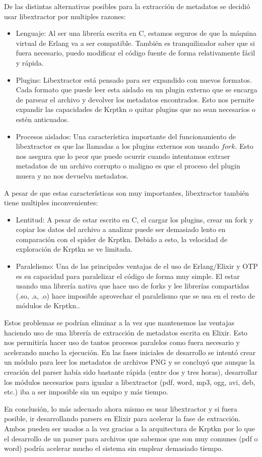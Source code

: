 De las distintas alternativas posibles para la extracción de metadatos se decidió usar libextractor por multiples razones:

\begin{itemize}
  \item Lenguaje: Al ser una librería escrita en C, estamos seguros de que la máquina virtual de Erlang va a ser compatible. También es tranquilizador saber que si fuera necesario, puedo modificar el código fuente de forma relativamente fácil y rápida.
  \item Plugins: Libextractor está pensado para ser expandido con nuevos formatos. Cada formato que puede leer esta aislado en un plugin externo que se encarga de parsear el archivo y devolver los metadatos encontrados. Esto nos permite expandir las capacidades de Krptkn o quitar plugins que no sean necesarios o estén anticuados.
  \item Procesos aislados: Una característica importante del funcionamiento de libextractor es que las llamadas a los plugins externos son usando $fork$. Esto nos asegura que lo peor que puede ocurrir cuando intentamos extraer metadatos de un archivo corrupto o maligno es que el proceso del plugin muera y no nos devuelva metadatos. 
\end{itemize}

A pesar de que estas características son muy importantes, libextractor también tiene multiples inconvenientes:
\begin{itemize}
  \item Lentitud: A pesar de estar escrito en C, el cargar los plugins, crear un fork y copiar los datos del archivo a analizar puede ser demasiado lento en comparación con el spider de Krptkn. Debido a esto, la velocidad de exploración de Krptkn se ve limitada.
  \item Paralelismo: Una de las principales ventajas de el uso de Erlang/Elixir y OTP es su capacidad para paralelizar el código de forma muy simple. El estar usando una librería nativa que hace uso de forks y lee librerías compartidas (.so, .a, .o) hace imposible aprovechar el paralelismo que se usa en el resto de módulos de Krptkn..
\end{itemize}

Estos problemas se podrían eliminar a la vez que mantenemos las ventajas haciendo uso de una librería de extracción de metadatos escrita en Elixir. Esto nos permitiría hacer uso de tantos procesos paralelos como fuera necesario y acelerando mucho la ejecución. En las fases iniciales de desarrollo se intentó crear un módulo para leer los metadatos de archivos PNG y se concluyó que aunque la creación del parser había sido bastante rápida (entre dos y tres horas), desarrollar los módulos necesarios para igualar a libextractor (pdf, word, mp3, ogg, avi, deb, etc.) iba a ser imposible sin un equipo y más tiempo.

En conclusión, lo más adecuado ahora mismo es usar libextractor y si fuera posible, ir desarrollando parsers en Elixir para acelerar la fase de extracción. Ambos pueden ser usados a la vez gracias a la arquitectura de Krptkn por lo que el desarrollo de un parser para archivos que sabemos que son muy comunes (pdf o word) podría acelerar mucho el sistema sin emplear demasiado tiempo.
